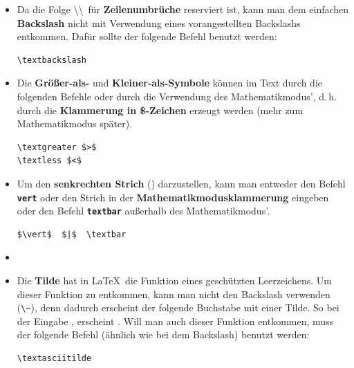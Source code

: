 \begin{frame}[fragile]

\begin{itemize}

\item Da die Folge \textbackslash\textbackslash\ für \textbf{Zeilenumbrüche} reserviert ist, kann man dem einfachen \textbf{Backslash} \gqq{\textbackslash} nicht mit Verwendung eines vorangestellten Backslashs entkommen. Dafür sollte der folgende Befehl benutzt werden:

\begin{lstlisting}
\textbackslash 
\end{lstlisting}

\item Die \textbf{Größer-als-} \gqq{\textgreater} und \textbf{Kleiner-als-Symbole} \gqq{\textless} können im Text durch die folgenden Befehle oder durch die Verwendung des Mathematikmodus', d.\,h. durch die \textbf{Klammerung in \$-Zeichen} erzeugt werden (mehr zum Mathematikmodus später).

\begin{lstlisting}
\textgreater $>$
\textless $<$
\end{lstlisting}

\end{itemize}

\end{frame}


\begin{frame}[fragile]

\begin{itemize}

\item Um den \textbf{senkrechten Strich} () darzustellen, kann man entweder den Befehl \textbf{\texttt{vert}} oder den Strich in der \textbf{Mathematikmodusklammerung} eingeben oder den Befehl \textbf{\texttt{textbar}} außerhalb des Mathematikmodus'.

\begin{lstlisting}
$\vert$  $|$  \textbar
\end{lstlisting}

\item[]

\item Die \textbf{Tilde} \gqq{\textasciitilde} hat in \LaTeX\ die Funktion eines geschützten Leerzeichens. Um dieser Funktion zu entkommen, kann man nicht den Backslash verwenden (\lstinline|\~|), denn dadurch erscheint der folgende Buchstabe mit einer Tilde. So bei der Eingabe , erscheint . Will man auch dieser Funktion entkommen, muss der folgende Befehl (ähnlich wie bei dem Backslash) benutzt werden:

\begin{lstlisting}
\textasciitilde
\end{lstlisting}

\end{itemize}

\end{frame}


